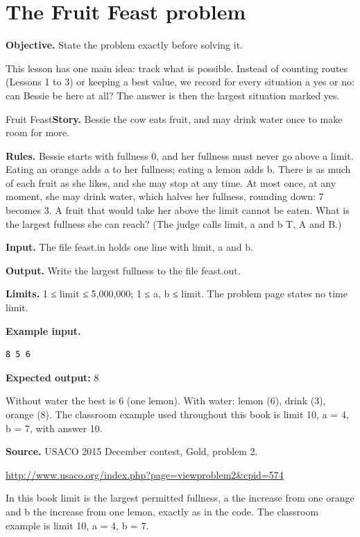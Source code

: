 \documentclass[11pt,a4paper,oneside]{report}
\newcommand{\classref}[1]{\marginpar{\raggedright\fontsize{9}{12}\selectfont\color{quiet}\colorbox{wash}{\heavy\fontsize{8}{10}\selectfont IN THE CLASSROOM}\par\smallskip#1}}
\newcommand{\sectiongoal}[1]{\par{\color{quiet}\textbf{Objective.} #1}\par\smallskip}
\begin{document}
\section{The Fruit Feast problem}
\classref{L4-01}
\sectiongoal{State the problem exactly before solving it.}
This lesson has one main idea: track what is possible. Instead of counting routes (Lessons 1 to 3) or keeping a best value, we record for every situation a yes or no: can Bessie be here at all? The answer is then the largest situation marked yes.

\begin{problembox}{Fruit Feast}\textbf{Story.} Bessie the cow eats fruit, and may drink water once to make room for more.\par\smallskip \textbf{Rules.} Bessie starts with fullness 0, and her fullness must never go above a limit. Eating an orange adds a to her fullness; eating a lemon adds b. There is as much of each fruit as she likes, and she may stop at any time. At most once, at any moment, she may drink water, which halves her fullness, rounding down: 7 becomes 3. A fruit that would take her above the limit cannot be eaten. What is the largest fullness she can reach? (The judge calls limit, a and b T, A and B.)\par\smallskip \textbf{Input.} The file feast.in holds one line with limit, a and b.\par\smallskip \textbf{Output.} Write the largest fullness to the file feast.out.\par\smallskip \textbf{Limits.} 1 ≤ limit ≤ 5,000,000; 1 ≤ a, b ≤ limit. The problem page states no time limit.\par\smallskip \textbf{Example input.}
\begin{lstlisting}[language={},aboveskip=2pt,belowskip=2pt]
8 5 6
\end{lstlisting}
\textbf{Expected output:} 8\par\smallskip Without water the best is 6 (one lemon). With water: lemon (6), drink (3), orange (8). The classroom example used throughout this book is limit 10, a = 4, b = 7, with answer 10.\par\smallskip\textbf{Source.} USACO 2015 December contest, Gold, problem 2.\par\url{http://www.usaco.org/index.php?page=viewproblem2&cpid=574}\end{problembox}
In this book limit is the largest permitted fullness, a the increase from one orange and b the increase from one lemon, exactly as in the code. The classroom example is limit 10, a = 4, b = 7.
\end{document}
